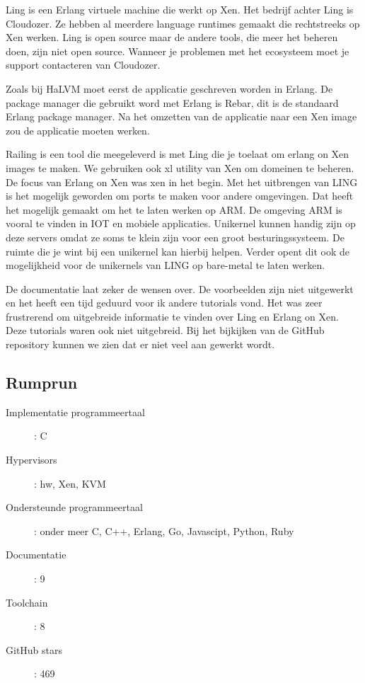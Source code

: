 \documentclass[pdftex,a4paper,12pt,twoside]{report}
\begin{document}
Ling is een Erlang virtuele machine die werkt op Xen. Het bedrijf achter Ling is Cloudozer. Ze hebben al meerdere language runtimes gemaakt die rechtstreeks op Xen werken.
Ling is open source maar de andere tools, die meer het beheren doen, zijn niet open source. Wanneer je problemen met het ecosysteem moet je support contacteren van Cloudozer.

Zoals bij HaLVM moet eerst de applicatie geschreven worden in Erlang. De package manager die gebruikt word met Erlang is Rebar, dit is de standaard Erlang package manager. Na het omzetten van de applicatie naar een Xen image zou de applicatie moeten werken.

Railing is een tool die meegeleverd is met Ling die je toelaat om erlang on Xen images te maken. We gebruiken ook xl utility van Xen om domeinen te beheren. 
De focus van Erlang on Xen was xen in het begin. Met het uitbrengen van LING is het mogelijk geworden om ports te maken voor andere omgevingen. Dat heeft het mogelijk gemaakt om het te laten werken op ARM. De omgeving ARM is vooral te vinden in IOT en mobiele applicaties. Unikernel kunnen handig zijn op deze servers omdat ze soms te klein zijn voor een groot besturingssysteem. De ruimte die je wint bij een unikernel kan hierbij helpen. Verder opent dit ook de mogelijkheid voor de unikernels van LING op bare-metal te laten werken.

De documentatie laat zeker de wensen over. De voorbeelden zijn niet uitgewerkt en het heeft een tijd geduurd voor ik andere tutorials vond. 
Het was zeer frustrerend om uitgebreide informatie te vinden over Ling en Erlang on Xen.
Deze tutorials waren ook niet uitgebreid. Bij het bijkijken van de GitHub repository kunnen we zien dat er niet veel aan gewerkt wordt.

\newpage

\subsection{Rumprun}

\begin{description}
  \item [Implementatie programmeertaal]: C
  \item [Hypervisors]: hw, Xen, KVM
  \item [Ondersteunde programmeertaal]: onder meer C, C++, Erlang, Go, Javascipt, Python, Ruby
  \item [Documentatie]: 9
  \item [Toolchain]: 8
  \item [GitHub stars]: 469
\end{description}
\end{document}
